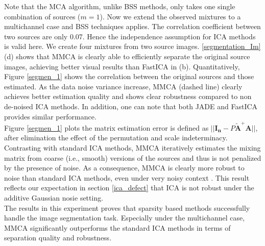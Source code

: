 Note that the MCA algorithm, unlike BSS methods, only takes one single combination of sources ($m = 1$). Now we extend the observed mixtures to a multichannel case and BSS techniques applies. The correlation coefficient between two sources are only 0.07. Hence the independence assumption for ICA methods is valid here. We create four mixtures from two source images.
\ref{segmentation_Im} (d) shows that MMCA is clearly able to efficiently separate the original source images, achieving better visual results than FastICA in (b). Quantitatively, Figure \ref{segmen_1} shows the correlation between the original sources and those estimated. As the data noise variance increase, 
MMCA (dashed line) clearly achieves better estimation quality and shows clear robustness compared to non de-noised ICA methods. In addition, one can note that both JADE and FastICA provides similar performance.\\

Figure \ref{segmen_1} plots the matrix estimation error is defined as $||\mathbf{I_n} - P\tilde{\mathbf{A}}^{+}\mathbf{A} ||$, after elimination the effect of the permutation and scale indeterminacy. Contrasting with standard ICA methods, MMCA iteratively estimates the mixing matrix from coarse (i.e., smooth) versions of the sources and thus is not penalized by the presence of noise. As a consequence, MMCA is clearly more robust to noise than standard ICA methods, even under very noisy context \cite{BobinJ_2006Mdas}. This result reflects our expectation in section \ref{ica_defect} that ICA is not robust under the additive Gaussian nosie setting.\\

The results in this experiment proves that sparsity based methods successfully handle the image segmentation task. Especially under the multichannel case, MMCA significantly outperforms the standard ICA methods in terms of separation quality and robustness.\\




